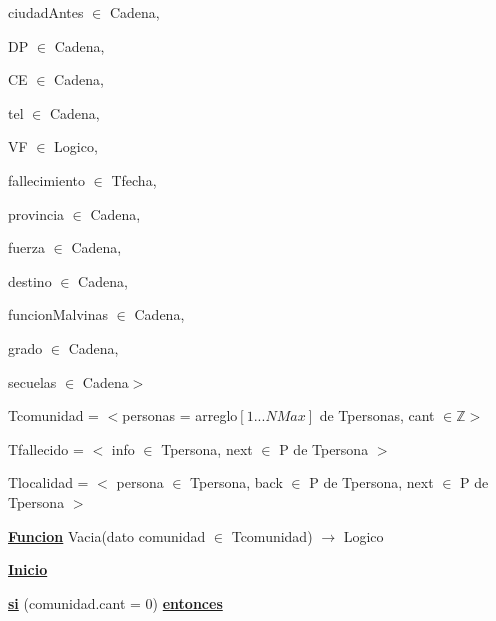 \documentclass{article}
\begin{document}
        \hspace{8mm}ciudadAntes $\in$ Cadena, 
        
        \hspace{8mm}DP $\in$ Cadena, 
        
        \hspace{8mm}CE $\in$ Cadena, 
        
        \hspace{8mm}tel $\in$ Cadena, 
        
        \hspace{8mm}VF $\in$ Logico, 
        
        \hspace{8mm}fallecimiento $\in$ Tfecha,

        \hspace{8mm}provincia $\in$ Cadena,

        \hspace{8mm}fuerza $\in$ Cadena,

        \hspace{8mm}destino $\in$ Cadena,

        \hspace{8mm}funcionMalvinas $\in$ Cadena,

        \hspace{8mm}grado $\in$ Cadena,

        \hspace{8mm}secuelas $\in$ Cadena$>$

    \hspace{4mm}Tcomunidad = $<$personas = arreglo$[1...NMax]$ de Tpersonas, cant $\in \mathbb{Z}$$>$

    \hspace{4mm}Tfallecido = $<$ info $\in$ Tpersona, next $\in$ P de Tpersona $>$

    \hspace{4mm}Tlocalidad = $<$ persona $\in$ Tpersona, back $\in$ P de Tpersona, next $\in$ P de Tpersona $>$

    \vspace{4mm}

    \hspace{4mm}\underline{\textbf{Funcion}} Vacia(dato comunidad $\in$ Tcomunidad) $\rightarrow$ Logico

        \hspace{8mm}\underline{\textbf{Inicio}}

            \hspace{12mm}\underline{\textbf{si}} (comunidad.cant = 0) \underline{\textbf{entonces}}
\end{document}
